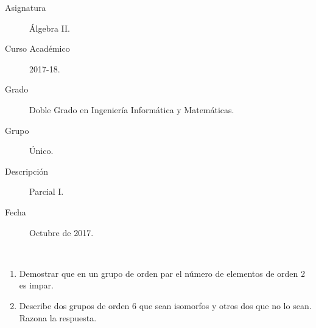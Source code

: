 \documentclass[12pt]{article}
\begin{document}

    
    

    \begin{description}
        \item[Asignatura] Álgebra II.
        \item[Curso Académico] 2017-18.
        \item[Grado] Doble Grado en Ingeniería Informática y Matemáticas.
        \item[Grupo] Único.
        \item[Descripción] Parcial I.
        \item[Fecha] Octubre de 2017.
    
    \end{description}
    \newpage

    \begin{ejercicio}~
        \begin{enumerate}
            \item Demostrar que en un grupo de orden par el número de elementos de orden 2 es impar.
            \item Describe dos grupos de orden 6 que sean isomorfos y otros dos que no lo sean. Razona la respuesta.
        \end{enumerate}
    \end{ejercicio}
\end{document}
